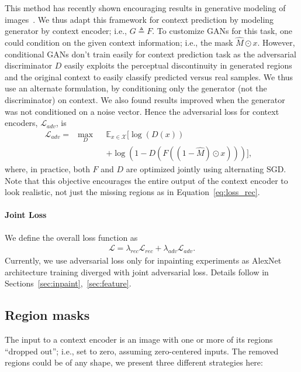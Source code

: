 \documentclass[10pt,twocolumn,letterpaper]{article}
\newcommand{\refeq}[1]{Equation~\eqref{eq:#1}}
\newcommand{\lbleq}[1]{\label{eq:#1}}
\begin{document}
This method has recently shown encouraging results in generative modeling of images~\cite{dcgan}.
We thus adapt this framework for context prediction by modeling generator by context encoder; i.e., $G \triangleq F$.
To customize GANs for this task, one could condition on the given context information; i.e., the mask $\hat{M} \odot x$.
However, conditional GANs don't train easily for context prediction task as the adversarial discriminator $D$ easily exploits the perceptual discontinuity in generated regions and the original context to easily classify predicted versus real samples.
We thus use an alternate formulation, by conditioning only the generator (not the discriminator) on context.
We also found results improved when the generator was not conditioned on a noise vector.
Hence the adversarial loss for context encoders, $\mathcal{L}_{adv}$, is
\begin{align}
\mathcal{L}_{adv} = & \max_{D} & & \mathbb{E}_{x\in \mathcal{X}}\lbrack\log (D(x)) & \nonumber\\
& & & + \log (1-D(F((1-\hat{M})\odot x)))\rbrack, & \lbleq{loss_adv}
\end{align}
where, in practice, both $F$ and $D$ are optimized jointly using alternating SGD.
Note that this objective encourages the entire output of the context encoder to look realistic, not just the missing regions as in \refeq{loss_rec}.

\paragraph{Joint Loss}
We define the overall loss function as
\begin{align}
\mathcal{L} = \lambda_{rec}\mathcal{L}_{rec} + \lambda_{adv}\mathcal{L}_{adv} \lbleq{loss}.
\end{align}
Currently, we use adversarial loss only for inpainting experiments as AlexNet~\cite{krizhevsky2012imagenet} architecture training diverged with joint adversarial loss.
Details follow in Sections~\ref{sec:inpaint},~\ref{sec:feature}.





\subsection{Region masks}
\label{sec:regdrop}
The input to a context encoder is an image with one or more of its regions ``dropped out''; i.e., set to zero, assuming zero-centered inputs.
The removed regions could be of any shape, we present three different strategies here:
\end{document}
